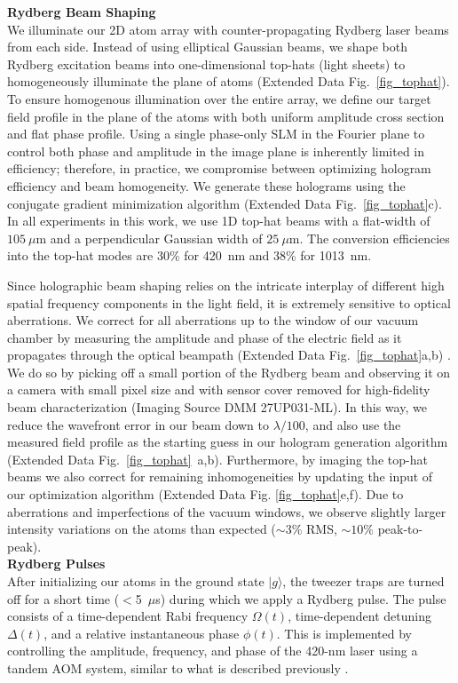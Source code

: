 \documentclass[reprint,twocolumn,secnumarabic,amssymb, aps, prl]{revtex4-1}
\begin{document}
\noindent\textbf{Rydberg Beam Shaping}\\
We illuminate our 2D atom array with counter-propagating Rydberg laser beams from each side. Instead of using elliptical Gaussian beams, we shape both Rydberg excitation beams into one-dimensional top-hats (light sheets) to homogeneously illuminate the plane of atoms (Extended Data Fig.~\ref{fig_tophat}). To ensure homogenous illumination over the entire array, we define our target field profile in the plane of the atoms with both uniform amplitude cross section and flat phase profile. Using a single phase-only SLM in the Fourier plane to control both phase and amplitude in the image plane is inherently limited in efficiency; therefore, in practice, we compromise between optimizing hologram efficiency and beam homogeneity. We generate these holograms using the conjugate gradient minimization algorithm (Extended Data Fig.~\ref{fig_tophat}c)\cite{Bowman:17}. In all experiments in this work, we use 1D top-hat beams with a flat-width of $105~\mu$m and a perpendicular Gaussian width of $25~\mu$m. The conversion efficiencies into the top-hat modes are 30\% for 420~nm and 38\% for 1013~nm.

Since holographic beam shaping relies on the intricate interplay of different high spatial frequency components in the light field, it is extremely sensitive to optical aberrations. 
We correct for all aberrations up to the window of our vacuum chamber by measuring the amplitude and phase of the electric field as it propagates through the optical beampath (Extended Data Fig.~\ref{fig_tophat}a,b) \cite{Zupancic:16}. We do so by picking off a small portion of the Rydberg beam and observing it on a camera with small pixel size and with sensor cover removed for high-fidelity beam characterization (Imaging Source DMM 27UP031-ML). In this way, we reduce the wavefront error in our beam down to $\lambda/100$, and also use the measured field profile as the starting guess in our hologram generation algorithm (Extended Data Fig.~\ref{fig_tophat}~a,b). Furthermore, by imaging the top-hat beams we also correct for remaining inhomogeneities by updating the input of our optimization algorithm (Extended Data Fig. \ref{fig_tophat}e,f). Due to aberrations and imperfections of the vacuum windows, we observe slightly larger intensity variations on the atoms than expected ($\sim 3\%$ RMS, $\sim 10\%$ peak-to-peak). \\



\noindent\textbf{Rydberg Pulses}\\
After initializing our atoms in the ground state $|g\rangle$, the tweezer traps are turned off for a short time ($<$5~$\mu$s) during which we apply a Rydberg pulse. The pulse consists of a time-dependent Rabi frequency $\Omega(t)$, time-dependent detuning $\Delta(t)$, and a relative instantaneous phase $\phi(t)$. This is implemented by controlling the amplitude, frequency, and phase of the 420-nm laser using a tandem AOM system, similar to what is described previously \cite{AtomArrayCats2019}.\\
\end{document}
